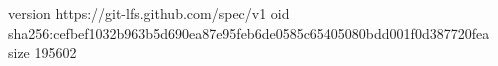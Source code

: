 version https://git-lfs.github.com/spec/v1
oid sha256:cefbef1032b963b5d690ea87e95feb6de0585c65405080bdd001f0d387720fea
size 195602
